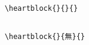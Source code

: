 \documentclass[letterpaper]{article}
\begin{document}
\begin{verbatim}

    \heartblock{}{}{}

\end{verbatim}

\pagebreak

\renewcommand{\kanji}{\centering\fontsize{60}{60}}

\vspace*{0.5cm}
\begin{multicols}{4}
	\RLmulticolcolumns
	
	\columnbreak
	
	
	\columnbreak
	
	
	\columnbreak
	
	
\end{multicols}

\begin{verbatim}

    \heartblock{}{無}{}
    
\end{verbatim}

\vfill\eject\pagebreak


\vspace*{1cm}

\renewcommand{\kanji}{\centering\fontsize{55}{55}}
\vspace*{2cm}

\begin{multicols}{4}
	\RLmulticolcolumns
	
	\columnbreak
		
	\columnbreak

	\columnbreak
	

\end{multicols}
\end{document}
